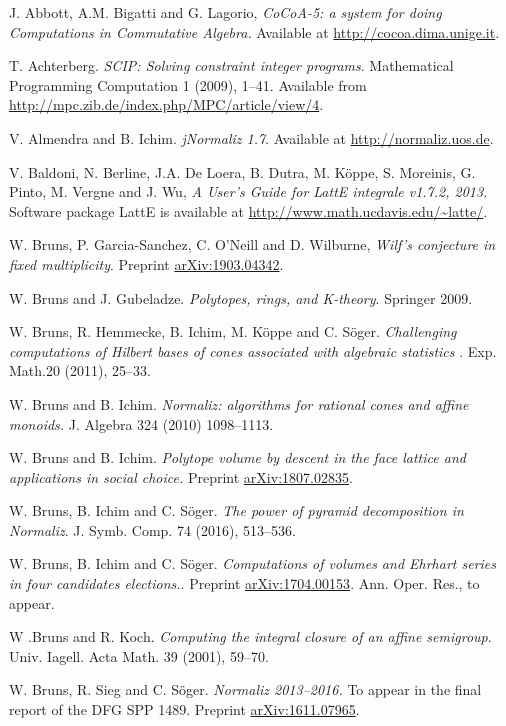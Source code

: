 \documentclass[12pt,a4paper]{scrartcl}
\theoremstyle{definition}
\begin{document}
\begin{thebibliography}{15.}
\small

J. Abbott, A.M. Bigatti and G. Lagorio,
\emph{CoCoA-5: a system for doing {C}omputations in {C}ommutative {A}lgebra.}
Available at \url{http://cocoa.dima.unige.it}.

 T. Achterberg. {\em SCIP: Solving constraint integer programs}. Mathematical Programming Computation 1 (2009), 1--41. Available from \url{http://mpc.zib.de/index.php/MPC/article/view/4}.

 V. Almendra  and B. Ichim. {\em  jNormaliz 1.7}.
Available at \url{http://normaliz.uos.de}.

 V. Baldoni, N. Berline, J.A. De Loera, B. Dutra, M. K\"oppe, S. Moreinis, G. Pinto, M. Vergne and  J. Wu,
\emph{A User's Guide for LattE integrale v1.7.2, 2013.} Software package
LattE is available at \url{http://www.math.ucdavis.edu/~latte/}.

 W. Bruns, P. Garcia-Sanchez, C. O'Neill and D. Wilburne, \emph{Wilf's conjecture in fixed multiplicity}. Preprint \url{arXiv:1903.04342}.


 W. Bruns and J. Gubeladze. {\em Polytopes, rings, and K-theory}.
Springer 2009.

 W. Bruns, R. Hemmecke, B. Ichim, M. K\"oppe and C. S\"oger.
{\em Challenging computations of Hilbert bases of cones associated with
algebraic statistics }. Exp. Math.20 (2011), 25--33.

 W. Bruns and B. Ichim. {\em Normaliz: algorithms for rational cones and affine monoids.}
J. Algebra 324 (2010) 1098--1113.

 W. Bruns and B. Ichim. {\em Polytope volume by descent in the face lattice and applications in social choice.} Preprint \url{arXiv:1807.02835}.

 W. Bruns, B. Ichim and C. S\"oger. {\em The power of
pyramid decomposition in Normaliz}. J. Symb. Comp. 74 (2016), 513--536.

 W. Bruns, B. Ichim and C. S\"oger. {\em Computations of volumes and Ehrhart series in four candidates elections.}. Preprint \url{arXiv:1704.00153}. Ann. Oper. Res., to appear.

 W .Bruns and R. Koch. {\em Computing the integral
closure of an affine semigroup}. Univ. Iagell. Acta Math.
39 (2001), 59--70.

 W. Bruns, R. Sieg and C. S\"oger. {\em Normaliz 2013--2016.} To appear in the final report of the DFG SPP 1489. Preprint \url{ arXiv:1611.07965}.


\end{thebibliography}
\end{document}
